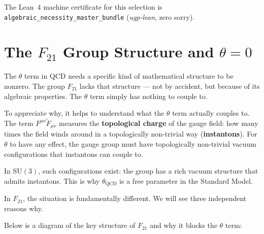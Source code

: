 \documentclass[11pt,a4paper]{article}
\newcommand{\term}[1]{\textbf{#1}}
\newcommand{\lean}[1]{\texttt{#1}}
\begin{document}
The Lean~4 machine certificate for this selection is
\lean{algebraic\_necessity\_master\_bundle} (\textit{ugp-lean}, zero sorry).

\section{The $F_{21}$ Group Structure and $\theta = 0$}

\begin{tcolorbox}[colback=boxblue,colframe=blue!40!black,title=The core insight]
The $\theta$ term in QCD needs a specific kind of mathematical structure to be nonzero.  The group $F_{21}$ lacks that structure --- not by accident, but because of its algebraic properties.  The $\theta$ term simply has nothing to couple to.
\end{tcolorbox}

\medskip
To appreciate why, it helps to understand what the $\theta$ term actually couples to.  The term $F^{\mu\nu}\tilde{F}_{\mu\nu}$ measures the \term{topological charge} of the gauge field: how many times the field winds around in a topologically non-trivial way (\term{instantons}).  For $\theta$ to have any effect, the gauge group must have topologically non-trivial vacuum configurations that instantons can couple to.

In $\mathrm{SU}(3)$, such configurations exist: the group has a rich vacuum structure that admits instantons.  This is why $\theta_{\mathrm{QCD}}$ is a free parameter in the Standard Model.

In $F_{21}$, the situation is fundamentally different.  We will see three independent reasons why.

\medskip
Below is a diagram of the key structure of $F_{21}$ and why it blocks the $\theta$ term:
\end{document}
